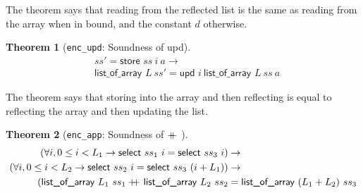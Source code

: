 \documentclass[onecolumn, preprint]{sigplanconf}
\newcommand{\select}[2]{\textsf{select } #1\ #2}
\newcommand{\store}[3]{\textsf{store } #1\ #2\ #3}
\newcommand{\loa}[2]{\textsf{list\_of\_array } #1\ #2}
\newcommand{\unth}[3]{\textsf{upd } #1\ #2\ #3}
\newcommand{\codeinl}[1]{\texttt{#1}}
\newcommand\doubleplus{+\kern-1.3ex+\kern0.8ex}
\newtheorem{theorem}{Theorem}
\begin{document}
The theorem says that reading from the reflected list is the same as reading from the array when in bound, and the constant $d$ otherwise. %

\begin{theorem}[\texttt{enc\_upd}: Soundness of \textsf{upd}]
  \begin{align*}
  & ss' = \store{ss}{i}{a} \to \\
  &  \loa{L}{ss'} = \unth{i}{\loa{L}{ss}}{a}
\end{align*}
\end{theorem}

The theorem says that storing into the array and then reflecting is equal to reflecting the array and then updating the list.

\begin{theorem}[\texttt{enc\_app}: Soundness of $\doubleplus$]
\begin{align*}
(\forall i, 0 \leq i < L_1 \to \select{ss_1}{i} = \select{ss_3}{i}) &\to \\
  (\forall i, 0 \leq i < L_2 \to \select{ss_2}{i} = \select{ss_3}{(i + L_1)}) &\to  \\
  (\loa{L_1}{ss_1} \doubleplus \loa{L_2}{ss_2} &= \loa{(L_1 + L_2)}{ss_3}
\end{align*}
\end{theorem}
\end{document}
